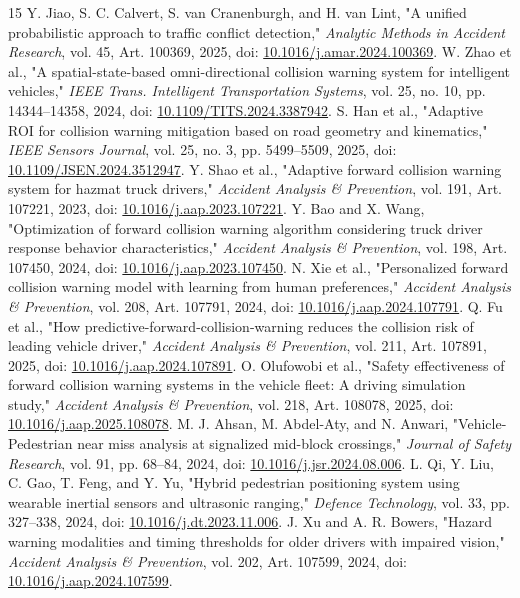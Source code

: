 \documentclass[conference]{IEEEtran}
\begin{document}
\begin{thebibliography}{15}
 Y. Jiao, S. C. Calvert, S. van Cranenburgh, and H. van Lint, "A unified probabilistic approach to traffic conflict detection," \emph{Analytic Methods in Accident Research}, vol. 45, Art. 100369, 2025, doi: \url{10.1016/j.amar.2024.100369}.
 W. Zhao et al., "A spatial-state-based omni-directional collision warning system for intelligent vehicles," \emph{IEEE Trans. Intelligent Transportation Systems}, vol. 25, no. 10, pp. 14344--14358, 2024, doi: \url{10.1109/TITS.2024.3387942}.
 S. Han et al., "Adaptive ROI for collision warning mitigation based on road geometry and kinematics," \emph{IEEE Sensors Journal}, vol. 25, no. 3, pp. 5499--5509, 2025, doi: \url{10.1109/JSEN.2024.3512947}.
 Y. Shao et al., "Adaptive forward collision warning system for hazmat truck drivers," \emph{Accident Analysis \& Prevention}, vol. 191, Art. 107221, 2023, doi: \url{10.1016/j.aap.2023.107221}.
 Y. Bao and X. Wang, "Optimization of forward collision warning algorithm considering truck driver response behavior characteristics," \emph{Accident Analysis \& Prevention}, vol. 198, Art. 107450, 2024, doi: \url{10.1016/j.aap.2023.107450}.
 N. Xie et al., "Personalized forward collision warning model with learning from human preferences," \emph{Accident Analysis \& Prevention}, vol. 208, Art. 107791, 2024, doi: \url{10.1016/j.aap.2024.107791}.
 Q. Fu et al., "How predictive-forward-collision-warning reduces the collision risk of leading vehicle driver," \emph{Accident Analysis \& Prevention}, vol. 211, Art. 107891, 2025, doi: \url{10.1016/j.aap.2024.107891}.
 O. Olufowobi et al., "Safety effectiveness of forward collision warning systems in the vehicle fleet: A driving simulation study," \emph{Accident Analysis \& Prevention}, vol. 218, Art. 108078, 2025, doi: \url{10.1016/j.aap.2025.108078}.
 M. J. Ahsan, M. Abdel-Aty, and N. Anwari, "Vehicle-Pedestrian near miss analysis at signalized mid-block crossings," \emph{Journal of Safety Research}, vol. 91, pp. 68--84, 2024, doi: \url{10.1016/j.jsr.2024.08.006}.
 L. Qi, Y. Liu, C. Gao, T. Feng, and Y. Yu, "Hybrid pedestrian positioning system using wearable inertial sensors and ultrasonic ranging," \emph{Defence Technology}, vol. 33, pp. 327--338, 2024, doi: \url{10.1016/j.dt.2023.11.006}.
 J. Xu and A. R. Bowers, "Hazard warning modalities and timing thresholds for older drivers with impaired vision," \emph{Accident Analysis \& Prevention}, vol. 202, Art. 107599, 2024, doi: \url{10.1016/j.aap.2024.107599}.

\end{thebibliography}
\end{document}
